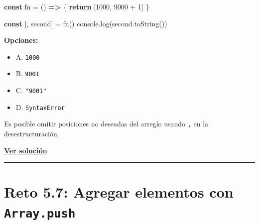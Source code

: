 \documentclass[
  letterpaper,
  DIV=11,
  numbers=noendperiod]{scrreprt}
\newenvironment{Shaded}{\begin{snugshade}}{\end{snugshade}}
\newcommand{\BuiltInTok}[1]{\textcolor[rgb]{0.00,0.23,0.31}{#1}}
\newcommand{\ControlFlowTok}[1]{\textcolor[rgb]{0.00,0.23,0.31}{\textbf{#1}}}
\newcommand{\DecValTok}[1]{\textcolor[rgb]{0.68,0.00,0.00}{#1}}
\newcommand{\FunctionTok}[1]{\textcolor[rgb]{0.28,0.35,0.67}{#1}}
\newcommand{\KeywordTok}[1]{\textcolor[rgb]{0.00,0.23,0.31}{\textbf{#1}}}
\newcommand{\NormalTok}[1]{\textcolor[rgb]{0.00,0.23,0.31}{#1}}
\newcommand{\OperatorTok}[1]{\textcolor[rgb]{0.37,0.37,0.37}{#1}}
\providecommand{\tightlist}{%
  \setlength{\itemsep}{0pt}\setlength{\parskip}{0pt}}
\begin{document}
\begin{Shaded}
\begin{Highlighting}[]
\KeywordTok{const}\NormalTok{ fn }\OperatorTok{=}\NormalTok{ () }\KeywordTok{=\textgreater{}}\NormalTok{ \{}
  \ControlFlowTok{return}\NormalTok{ [}\DecValTok{1000}\OperatorTok{,} \DecValTok{9000} \OperatorTok{+} \DecValTok{1}\NormalTok{]}
\NormalTok{\}}

\KeywordTok{const}\NormalTok{ [}\OperatorTok{,}\NormalTok{ second] }\OperatorTok{=} \FunctionTok{fn}\NormalTok{()}
\BuiltInTok{console}\OperatorTok{.}\FunctionTok{log}\NormalTok{(second}\OperatorTok{.}\FunctionTok{toString}\NormalTok{())}
\end{Highlighting}
\end{Shaded}

\textbf{Opciones:}

\begin{itemize}
\tightlist
\item
  A. \texttt{1000}
\item
  B. \texttt{9001}
\item
  C. \texttt{"9001"}
\item
  D. \texttt{SyntaxError}
\end{itemize}

\begin{tcolorbox}[enhanced jigsaw, left=2mm, toprule=.15mm, leftrule=.75mm, breakable, colback=white, coltitle=black, bottomtitle=1mm, arc=.35mm, rightrule=.15mm, colframe=quarto-callout-tip-color-frame, opacitybacktitle=0.6, toptitle=1mm, opacityback=0, titlerule=0mm, title=\textcolor{quarto-callout-tip-color}{\faLightbulb}\hspace{0.5em}{Pista}, bottomrule=.15mm, colbacktitle=quarto-callout-tip-color!10!white]

Es posible omitir posiciones no deseadas del arreglo usando \texttt{,}
en la desestructuración.

\end{tcolorbox}

\textbf{\hyperref[sec-sol-cap5-reto6]{Ver solución}}

\begin{center}\rule{0.5\linewidth}{0.5pt}\end{center}

\section{\texorpdfstring{Reto 5.7: Agregar elementos con
\texttt{Array.push}}{Reto 5.7: Agregar elementos con Array.push}}\label{sec-cap5-reto7}
\end{document}
